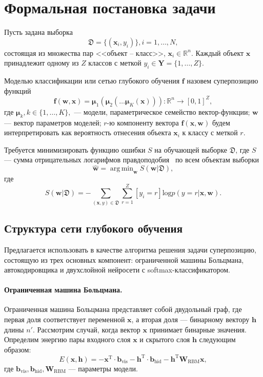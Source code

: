 \documentclass[12pt]{article}
\DeclareMathOperator*{\argmin}{arg\,min}
\begin{document}
\section{Формальная постановка задачи}
Пусть задана выборка \begin{equation}\label{eq:dataset}\mathfrak{D} = \{(\mathbf{x}_i,y_i)\}, i = 1,\dots,N,\end{equation} состоящая из множества пар <<объект -- класс>>, $\mathbf{x}_i \in \mathbb{R}^n$. Каждый объект $\mathbf{x}$ принадлежит одному из $Z$ классов с меткой $y_i \in \mathbf{Y} = \{1,\dots,Z\}$.

Моделью классификации или сетью глубокого обучения $\mathbf{f}$ назовем суперпозицию функций
\begin{equation}
\label{eq:main}
 \mathbf{f}(\mathbf{w}, \mathbf{x}) = \boldsymbol{{\mu}}_1(\boldsymbol{\mu}_2(\dots \boldsymbol{\mu}_K(\mathbf{x}))): \mathbb{R}^n \to [0,1]^Z,
\end{equation}
где $\boldsymbol{\mu}_k, k \in \{1,\dots,K\},$ --- модели, параметрическое семейство вектор-функции; $\mathbf{w}$ --- вектор параметров моделей;
$r$-ю компоненту вектора $\mathbf{f}(\mathbf{x},\mathbf{w})$ будем интерпретировать как вероятность отнесения объекта $\mathbf{x}_i$ к классу с меткой $r$.

Требуется минимизировать функцию ошибки $S$ на обучающей выборке $\mathfrak{D}$,
где $S$ --- сумма отрицательных логарифмов правдоподобия~\cite{nnl} по всем объектам выборки
\[
 \hat{\mathbf{w}} = \argmin_\mathbf{w} S(\mathbf{w}|\mathfrak{D}),
\]
где
\[
 S(\mathbf{w}|\mathfrak{D}) = -\sum_{(\mathbf{x},y) \in \mathfrak{D} } \sum_{r=1}^Z [y_i = r] \text{log} p(y=r|\mathbf{x},\mathbf{w}).
\]

\subsection{Структура сети глубокого обучения}
Предлагается использовать в качестве алгоритма решения задачи суперпозицию, состоящую из трех основных компонент:
ограниченной машины Больцмана, автокодировщика и двухслойной нейросети с softmax-классификатором.
\paragraph{Ограниченная машина Больцмана.}
Ограниченная машина Больцмана представляет собой двудольный граф, где первая доля соответствует переменной $\mathbf{x}$, а вторая доля --- бинарному вектору $\mathbf{h}$ длины $n'$.
Рассмотрим случай, когда вектор $\mathbf{x}$ принимает бинарные значения. Определим энергию пары входного слоя $\mathbf{x}$ и скрытого слоя $\mathbf{h}$ следующим образом:
\[
 E(\mathbf{x},\mathbf{h}) = -\mathbf{x}^\text{T} \cdot \mathbf{b}_\text{vis} -\mathbf{h}^\text{T} \cdot \mathbf{b}_\text{hid} - \mathbf{h}^\text{T}\mathbf{W}_\text{RBM}\mathbf{x},
\]
где $\mathbf{b}_\text{vis}, \mathbf{b}_\text{hid}, \mathbf{W}_\text{RBM}$ --- параметры модели.
\end{document}
